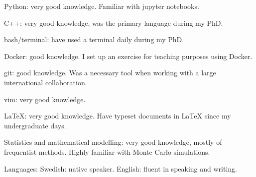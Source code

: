 



\begin{cvskills}


\cvskill
{Python:}
{very good knowledge. Familiar with jupyter notebooks.}

\cvskill
{C++:}
{very good knowledge, was the primary language during my PhD.}

\cvskill
{bash/terminal:}
{have used a terminal daily during my PhD.}

\cvskill
{Docker:} 
{good knowledge. I set up an exercise for teaching purposes using Docker.}

\cvskill
{git:}
{good knowledge. Was a necessary tool when working with a large international collaboration.}

\cvskill
{vim:}
{very good knowledge.}

\cvskill
{LaTeX:}
{very good knowledge. Have typeset documents in LaTeX since my undergraduate days.}

\cvskill
{Statistics and} {}
\cvskill
{mathematical modelling:}
{very good knowledge, mostly of frequentist methods. Highly familiar with Monte Carlo simulations.}

\cvskill
{Languages:}
{Swedish: native speaker. English: fluent in speaking and writing.}


\end{cvskills}